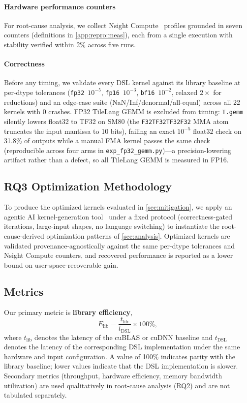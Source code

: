 \paragraph{Hardware performance counters}
For root-cause analysis, we collect Nsight Compute~\cite{nsightcompute2024} profiles grounded in seven counters (definitions in \cref{app:repro:meas}), each from a single execution with stability verified within 2\% across five runs.

\paragraph{Correctness}
Before any timing, we validate every DSL kernel against its library baseline at per-dtype tolerances (\texttt{fp32}~$10^{-5}$, \texttt{fp16}~$10^{-3}$, \texttt{bf16}~$10^{-2}$, relaxed $2\times$ for reductions) and an edge-case suite (NaN/Inf/denormal/all-equal) across all 22 kernels with 0 crashes.
FP32 TileLang GEMM is excluded from timing: \texttt{T.gemm} silently lowers float32 to TF32 on SM80 (the \texttt{F32TF32TF32F32} MMA atom truncates the input mantissa to 10 bits), failing an exact $10^{-5}$ float32 check on 31.8\% of outputs while a manual FMA kernel passes the same check (reproducible across four arms in \texttt{exp\_fp32\_gemm.py})---a precision-lowering artifact rather than a defect, so all TileLang GEMM is measured in FP16.


\subsection{RQ3 Optimization Methodology}
\label{sec:meth:optimization}

To produce the optimized kernels evaluated in \cref{sec:mitigation}, we apply an agentic AI kernel-generation tool~\cite{ako2026} under a fixed protocol (correctness-gated iterations, large-input shapes, no language switching) to instantiate the root-cause-derived optimization patterns of \cref{sec:analysis}.
Optimized kernels are validated provenance-agnostically against the same per-dtype tolerances and Nsight Compute counters, and recovered performance is reported as a lower bound on user-space-recoverable gain.


\subsection{Metrics}
\label{sec:meth:metrics}

Our primary metric is \textbf{library efficiency},
\[
E_{\mathrm{lib}} = \frac{t_{\mathrm{lib}}}{t_{\mathrm{DSL}}} \times 100\%,
\]
where $t_{\mathrm{lib}}$ denotes the latency of the cuBLAS or cuDNN baseline and $t_{\mathrm{DSL}}$ denotes the latency of the corresponding DSL implementation under the same hardware and input configuration.
A value of 100\% indicates parity with the library baseline; lower values indicate that the DSL implementation is slower.
Secondary metrics (throughput, hardware efficiency, memory bandwidth utilization) are used qualitatively in root-cause analysis (RQ2) and are not tabulated separately.


